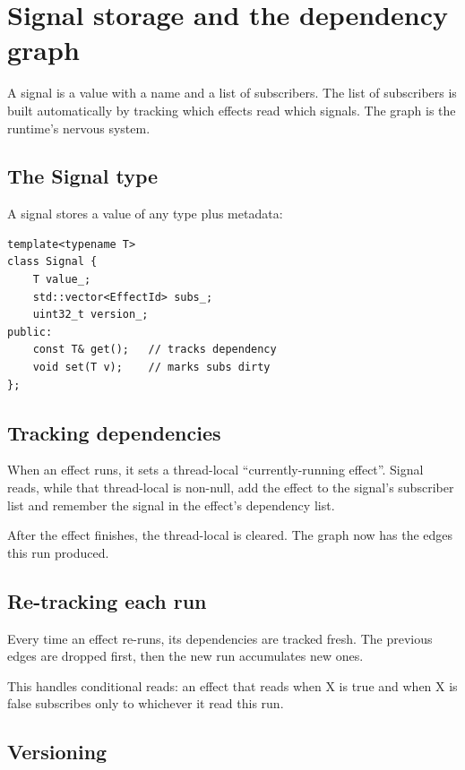 \chapter{Signal storage and the dependency graph}
\label{ch:signalgraph}

\begin{aside}
A signal is a value with a name and a list of subscribers. The
list of subscribers is built automatically by tracking which
effects read which signals. The graph is the runtime's nervous
system.
\end{aside}

\section{The Signal type}

A signal stores a value of any type plus metadata:

\begin{lstlisting}
template<typename T>
class Signal {
    T value_;
    std::vector<EffectId> subs_;
    uint32_t version_;
public:
    const T& get();   // tracks dependency
    void set(T v);    // marks subs dirty
};
\end{lstlisting}

\section{Tracking dependencies}

When an effect runs, it sets a thread-local
``currently-running effect''. Signal reads, while that
thread-local is non-null, add the effect to the signal's
subscriber list and remember the signal in the effect's
dependency list.

After the effect finishes, the thread-local is cleared. The
graph now has the edges this run produced.

\section{Re-tracking each run}

Every time an effect re-runs, its dependencies are tracked
fresh. The previous edges are dropped first, then the new
run accumulates new ones.

This handles conditional reads: an effect that reads
 when X is true and  when X is
false subscribes only to whichever it read this run.

\section{Versioning}


